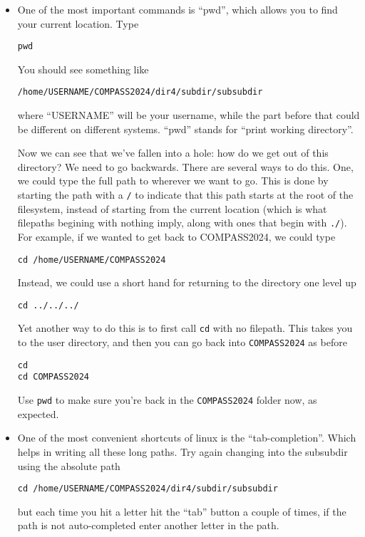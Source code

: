 \documentclass[aps,showpacs,prd,notitlepage,preprintnumbers,amsmath,amssymb,letterpaper]{revtex4}
\begin{document}
\begin{itemize}
\item One of the most
important commands is ``pwd'', which allows you to find your current
location. Type

\begin{verbatim}
pwd
\end{verbatim}

You should see something like

\begin{verbatim}
/home/USERNAME/COMPASS2024/dir4/subdir/subsubdir
\end{verbatim}

where ``USERNAME'' will be your username, while the part before that could be different on different systems. ``pwd'' stands for ``print working directory''.

Now we can see that we've fallen into a hole: how do we get out of this directory? We need to go backwards.
There are several ways to do this.
One, we could type the full path to wherever we want to go. This is done by starting the path with a \verb|/| to indicate that this path starts at the root of the filesystem, instead of starting from the current location (which is what filepaths begining with nothing imply, along with ones that begin with \verb|./|).
For example, if we wanted to get back to COMPASS2024, we could type

\begin{verbatim}
cd /home/USERNAME/COMPASS2024
\end{verbatim}

        Instead, we could use a short hand for returning to the directory one level up
\begin{verbatim}
cd ../../../
\end{verbatim}

        Yet another way to do this is to first call \verb|cd| with no filepath. This takes you to the user directory, and then you can go back into \verb|COMPASS2024| as before

\begin{verbatim}
cd
cd COMPASS2024
\end{verbatim}

        Use \verb|pwd| to make sure you're back in the \verb|COMPASS2024| folder now, as expected.

\item One of the most convenient shortcuts of linux is the
  ``tab-completion''. Which helps in writing all these long paths.
  Try again changing into the subsubdir using the absolute path

\begin{verbatim}
cd /home/USERNAME/COMPASS2024/dir4/subdir/subsubdir
\end{verbatim}

but each time you hit a letter hit the ``tab'' button a couple of
times, if the path is not auto-completed enter another letter in the
path.

\end{itemize}
\end{document}
